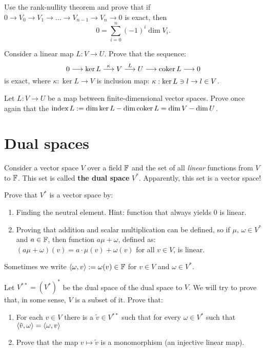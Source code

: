 \begin{prob}
  Use the rank-nullity theorem and prove that if $0\to V_0\to V_1\to\dots\to V_{n-1}\to V_n\to 0$ is exact, then
  $$0=\sum_{i=0}^n (-1)^i \dim V_i.$$
\end{prob}

\begin{prob}
  Consider a linear map $L : V\to U$. Prove that the sequence:
  $$0\longrightarrow \text{ker\,} L\stackrel{\kappa}{\longrightarrow} V\stackrel{L}{\longrightarrow} U\longrightarrow \text{coker\,} L \longrightarrow 0$$
  is exact, where $\kappa : \ker L \to V$ is inclusion map: $\kappa :\text{ker\,} L\ni l\to l\in V$.
\end{prob}

\begin{prob}
  Let $L : V\to U$ be a map between finite-dimensional vector spaces. Prove once again that the $\text{index\,} L:=\dim \text{ker\,} L - \dim \text{coker\,} L =\dim V - \dim U$.
\end{prob}

\section{Dual spaces}
Consider a vector space $V$ over a field $\mathbb F$ and the set of all \textit{linear} functions from $V$ to $\mathbb F$. This set is called
\textbf{the dual space} $V^*$. Apparently, this set is a vector space!
\begin{prob}
  Prove that $V^*$ is a vector space by:
  \begin{enumerate}
    \item Finding the neutral element. Hint: function that always yields 0 is linear.
    \item Proving that addition and scalar multiplication can be defined, so if $\mu,\,\omega \in V^*$ and $a\in \mathbb F$, then function $a\mu +\omega$, defined as:
     $(a\mu +\omega)(v) = a\cdot \mu(v) +\omega(v)$ for all $v\in V$, is linear.
  \end{enumerate}
\end{prob}

Sometimes we write $\langle \omega, v\rangle := \omega(v)\in \mathbb F$ for $v\in V$ and $\omega \in V^*$.

\begin{prob}
  Let $V^{**}=(V^*)^*$ be the dual space of the dual space to $V$. We will try to prove that, in some sense, $V$ is a subset of it. Prove that:
  \begin{enumerate}
    \item For each $v\in V$ there is a $\tilde v\in V^{**}$ such that for every $\omega \in V^*$ such that $\langle \tilde v, \omega\rangle=\langle \omega, v\rangle$
    \item Prove that the map $v\mapsto \tilde v$ is a monomorphism (an injective linear map).
  \end{enumerate}
\end{prob}

